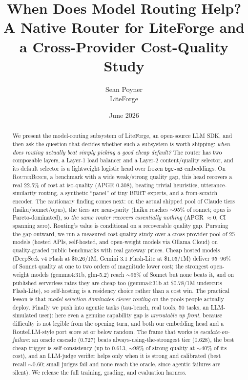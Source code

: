 \documentclass[11pt]{article}
\title{\textbf{When Does Model Routing Help?\\
A Native Router for LiteForge and a Cross-Provider Cost-Quality Study}}
\author{Sean Poyner \\ \small LiteForge}
\date{June 2026}
\newcommand{\rb}{\textsc{RouterBench}}
\newcommand{\code}[1]{\texttt{\small #1}}
\newcommand{\ROUTEREMBAPGR}{0.308}
\newcommand{\ROUTEREMBSAVED}{22.5}
\newcommand{\NPROV}{25}            %
\newcommand{\TAUN}{50}
\newcommand{\TAUORACLE}{0.727}     %
\newcommand{\TAUSTRONG}{0.628}     %
\newcommand{\TAUSELFG}{0.613}      %
\newcommand{\TAUJUDGEREC}{0.60}    %
\begin{document}
\maketitle

\begin{abstract}
We present the model-routing subsystem of LiteForge, an open-source LLM SDK, and then
ask the question that decides whether such a subsystem is worth shipping: \emph{when
does routing actually beat simply picking a good cheap default?} The router has two
composable layers, a Layer-1 load balancer and a Layer-2 content/quality selector, and
its default selector is a lightweight logistic head over frozen \code{bge-m3}
embeddings. On \rb{}, a benchmark with a wide weak/strong quality gap, this head
recovers a real \ROUTEREMBSAVED\% of cost at iso-quality (APGR \ROUTEREMBAPGR{}), beating
trivial heuristics, utterance-similarity routing, a synthetic ``panel'' of tiny BERT
experts, and a from-scratch encoder. The cautionary finding comes next: on the actual
shipped pool of Claude tiers (haiku/sonnet/opus), the tiers are near-parity (haiku
reaches $\sim$95\% of sonnet; opus is Pareto-dominated), so \emph{the same router
recovers essentially nothing} (APGR $\approx 0$, CI spanning zero). Routing's value is
conditional on a recoverable quality gap. Pursuing the gap outward, we run a measured
cost-quality study over a cross-provider pool of \NPROV{} models (hosted APIs,
self-hosted, and open-weight models via Ollama Cloud) on quality-graded public
benchmarks with real gateway prices. Cheap hosted models (DeepSeek v4 Flash at
\$0.26/1M, Gemini 3.1 Flash-Lite at \$1.05/1M) deliver 95--96\% of Sonnet quality at
one to two orders of magnitude lower cost; the strongest open-weight models (gemma4:31b,
glm-5.2) reach $\sim$96\% of Sonnet but none beats it, and on published serverless rates they
are cheap too (gemma4:31b at \$0.78/1M undercuts Flash-Lite), so self-hosting is a residency
choice rather than a cost win. The practical lesson is that \emph{model
selection dominates clever routing} on the pools people actually deploy. Finally we push
into agentic tasks (tau-bench, real tools, \TAUN{} tasks, an LLM-simulated user): here even
a genuine capability gap is \emph{unroutable up front}, because difficulty is not legible
from the opening turn, and both our embedding head and a RouteLLM-style port score at or
below random. The frame that works is \emph{escalate-on-failure}: an oracle cascade
(\TAUORACLE{}) beats always-using-the-strongest tier (\TAUSTRONG{}), the best cheap trigger
is self-consistency (up to \TAUSELFG{}, $\sim$98\% of strong quality at $\sim$40\% of its
cost), and an LLM-judge verifier helps only when it is strong and calibrated (best recall
$\sim$\TAUJUDGEREC{}; small judges fail and none reach the oracle, since agentic failures are
silent). We release the full training, grading, and evaluation harness.
\end{abstract}
\end{document}
